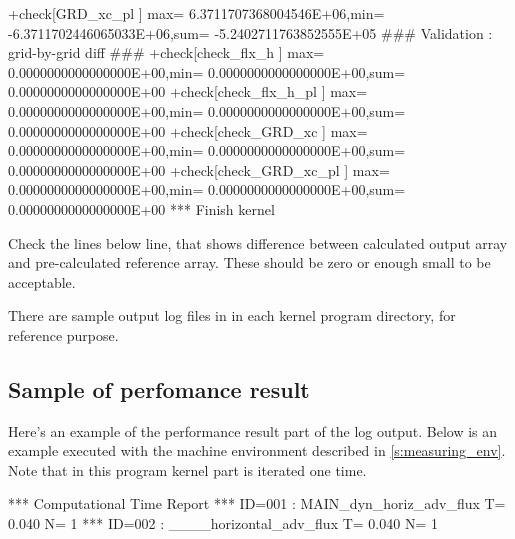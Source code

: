 \begin{LstLog}
 +check[GRD_xc_pl       ] max=  6.3711707368004546E+06,min= -6.3711702446065033E+06,sum= -5.2402711763852555E+05
 ### Validation : grid-by-grid diff ###
 +check[check_flx_h     ] max=  0.0000000000000000E+00,min=  0.0000000000000000E+00,sum=  0.0000000000000000E+00
 +check[check_flx_h_pl  ] max=  0.0000000000000000E+00,min=  0.0000000000000000E+00,sum=  0.0000000000000000E+00
 +check[check_GRD_xc    ] max=  0.0000000000000000E+00,min=  0.0000000000000000E+00,sum=  0.0000000000000000E+00
 +check[check_GRD_xc_pl ] max=  0.0000000000000000E+00,min=  0.0000000000000000E+00,sum=  0.0000000000000000E+00
 *** Finish kernel
\end{LstLog}

Check the lines below  line,
that shows difference between calculated output array and
pre-calculated reference array.
These should be zero or enough small to be acceptable.

There are sample output log files in 
in each kernel program directory, for reference purpose.

\subsection{Sample of perfomance result}

Here's an example of the performance result part of the log output.
Below is an example executed with the machine environment described in \autoref{s:measuring_env}.
%
Note that in this program kernel part is iterated one time.

\begin{LstLog}
 *** Computational Time Report
 *** ID=001 : MAIN_dyn_horiz_adv_flux          T=     0.040 N=      1
 *** ID=002 : ____horizontal_adv_flux          T=     0.040 N=      1
\end{LstLog}
